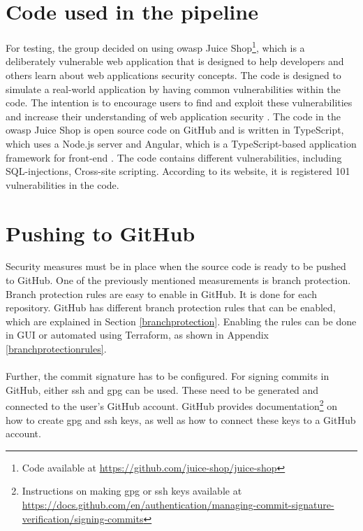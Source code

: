 \section{Code used in the pipeline}
For testing, the group decided on using \acrshort{owasp} Juice Shop\footnote{Code available at \url{https://github.com/juice-shop/juice-shop}}, which is a deliberately vulnerable web application that is designed to help developers and others learn about web applications security concepts. The code is designed to simulate a real-world application by having common vulnerabilities within the code. The intention is to encourage users to find and exploit these vulnerabilities and increase their understanding of web application security \cite{owaspJuiceShop}. The code in the \acrshort{owasp} Juice Shop is open source code on GitHub and is written in TypeScript, which uses a Node.js server and Angular, which is a TypeScript-based application framework for \gls{front-end} \cite{owaspJuiceShopCode}. The code contains different vulnerabilities, including \gls{SQL-injection}s, \gls{Cross-site scripting}. According to its website, it is registered 101 vulnerabilities in the code.

\section{Pushing to GitHub}
Security measures must be in place when the source code is ready to be pushed to GitHub. One of the previously mentioned measurements is branch protection. Branch protection rules are easy to enable in GitHub. It is done for each repository. GitHub has different branch protection rules that can be enabled, which are explained in Section \ref{branchprotection}. Enabling the rules can be done in \gls{GUI} or automated using Terraform, as shown in Appendix \ref{branchprotectionrules}. 
\\~\\
Further, the commit signature has to be configured. For signing commits in GitHub, either \acrshort{ssh} and \acrshort{gpg} can be used. These need to be generated and connected to the user's GitHub account.
GitHub provides documentation\footnote{Instructions on making \acrshort{gpg} or \acrshort{ssh} keys available at \url{https://docs.github.com/en/authentication/managing-commit-signature-verification/signing-commits}} on how to create \acrshort{gpg} and \acrshort{ssh} keys, as well as how to connect these keys to a GitHub account.

